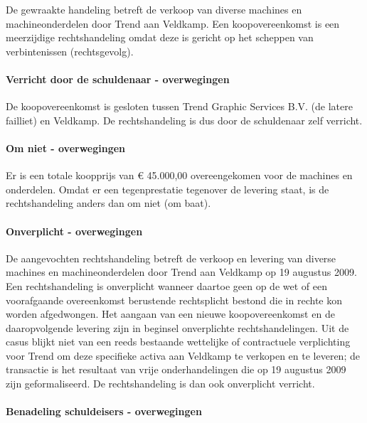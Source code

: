 \documentclass[
  dutch,
  a4paper,
]{article}
\begin{document}
De gewraakte handeling betreft de verkoop van diverse machines en machineonderdelen door Trend aan Veldkamp. Een koopovereenkomst is een meerzijdige rechtshandeling omdat deze is gericht op het scheppen van verbintenissen (rechtsgevolg).

\paragraph{Verricht door de schuldenaar - overwegingen}\label{verricht-door-de-schuldenaar---overwegingen-71}

De koopovereenkomst is gesloten tussen Trend Graphic Services B.V. (de latere failliet) en Veldkamp. De rechtshandeling is dus door de schuldenaar zelf verricht.

\paragraph{Om niet - overwegingen}\label{om-niet---overwegingen-71}

Er is een totale koopprijs van € 45.000,00 overeengekomen voor de machines en onderdelen. Omdat er een tegenprestatie tegenover de levering staat, is de rechtshandeling anders dan om niet (om baat).

\paragraph{Onverplicht - overwegingen}\label{onverplicht---overwegingen-71}

De aangevochten rechtshandeling betreft de verkoop en levering van diverse machines en machineonderdelen door Trend aan Veldkamp op 19 augustus 2009. Een rechtshandeling is onverplicht wanneer daartoe geen op de wet of een voorafgaande overeenkomst berustende rechtsplicht bestond die in rechte kon worden afgedwongen. Het aangaan van een nieuwe koopovereenkomst en de daaropvolgende levering zijn in beginsel onverplichte rechtshandelingen. Uit de casus blijkt niet van een reeds bestaande wettelijke of contractuele verplichting voor Trend om deze specifieke activa aan Veldkamp te verkopen en te leveren; de transactie is het resultaat van vrije onderhandelingen die op 19 augustus 2009 zijn geformaliseerd. De rechtshandeling is dan ook onverplicht verricht.

\paragraph{Benadeling schuldeisers - overwegingen}\label{benadeling-schuldeisers---overwegingen-71}
\end{document}

